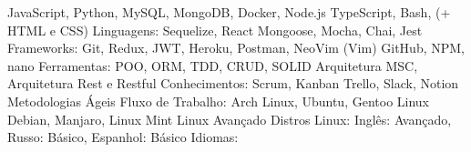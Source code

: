 \begin{cvhonors}
  \cvhonor
    {JavaScript, Python, MySQL, MongoDB, Docker, Node.js}
    {TypeScript, Bash, (+ HTML e CSS)}
    {}
    {Linguagens:}
  \cvhonor
    {Sequelize, React}
    {Mongoose, Mocha, Chai, Jest}
    {}
    {Frameworks:}
  \cvhonor
    {Git, Redux, JWT, Heroku, Postman, NeoVim (Vim)}
    {GitHub, NPM, nano}
    {}
    {Ferramentas:}
 \cvhonor
    {POO, ORM, TDD, CRUD, SOLID}
    {Arquitetura MSC, Arquitetura Rest e Restful}
    {}
    {Conhecimentos:}
  \cvhonor
    {Scrum, Kanban}
    {Trello, Slack, Notion}
    {Metodologias Ágeis}
    {Fluxo de Trabalho:}
  \cvhonor
    {Arch Linux, Ubuntu, Gentoo Linux}
    {Debian, Manjaro, Linux Mint}
    {Linux Avançado}
    {Distros Linux:}
  \cvhonor
    {Inglês: Avançado, Russo: Básico, Espanhol: Básico}
    {}
    {}
    {Idiomas:}
\end{cvhonors}

\vspace{.5cm}
